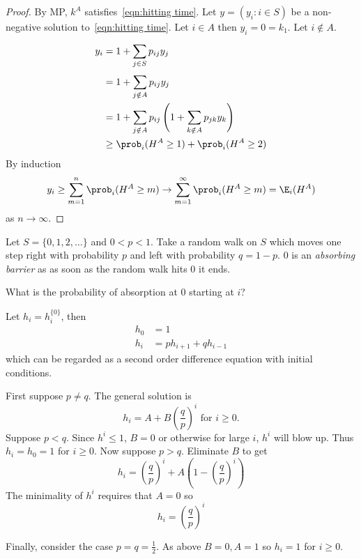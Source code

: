 \documentclass[a4paper]{article}
\begin{document}
\begin{proof}
  By MP, \(k^A\) satisfies~\eqref{eqn:hitting time}. Let \(y = (y_i: i \in S)\) be a non-negative solution to~\eqref{eqn:hitting time}. Let \(i \in A\) then \(y_i = 0 = k_1\). Let \(i \notin A\).
  \begin{align*}
    y_i &= 1 + \sum_{j \in S}^{ } p_{ij}y_j \\
        &= 1 + \sum_{j \notin A}^{ } p_{ij}y_j \\
        &= 1 + \sum_{j \notin A}^{ } p_{ij} \left( 1+ \sum_{k \notin A}^{ } p_{jk}y_k \right) \\
        &\geq \prob_i(H^A \geq 1) + \prob_i(H^A \geq 2)
  \end{align*}
  By induction
  \[
    y_i \geq \sum_{m = 1}^{n} \prob_i(H^A \geq m) \to \sum_{m = 1}^{\infty} \prob_i(H^A \geq m) = \E_i(H^A)
  \]
  as \(n \to \infty\).
\end{proof}

\begin{eg}
  Let \(S = \{0, 1, 2, \dots \}\) and \(0 < p < 1\). Take a random walk on \(S\) which moves one step right with probability \(p\) and left with probability \(q = 1 - p\). \(0\) is an \emph{absorbing barrier} as as soon as the random walk hits \(0\) it ends.

  \begin{question}
    What is the probability of absorption at \(0\) starting at \(i\)?
  \end{question}

  \begin{answer}
    Let \(h_i = h_i^{\{0\}}\), then
    \begin{align*}
      h_0 &= 1 \\
      h_i &= p h_{i+1} + q h_{i-1}
    \end{align*}
    which can be regarded as a second order difference equation with initial conditions.

    First suppose \(p \neq q\). The general solution is
    \[
      h_i = A + B \left( \frac{q}{p} \right)^i \text{ for } i \geq 0.
    \]
    Suppose \(p < q\). Since \(h^i \leq 1\), \(B = 0\) or otherwise for large \(i\), \(h^i\) will blow up. Thus \(h_i = h_0 = 1\) for \(i \geq 0\). Now suppose \(p > q\). Eliminate \(B\) to get
    \[
      h_i = \left( \frac{q}{p} \right)^i + A \left( 1 - \left( \frac{q}{p} \right)^i \right)
    \]
    The minimality of \(h^i\) requires that \(A = 0\) so
    \[
      h_i = \left( \frac{q}{p} \right)^i
    \]

    Finally, consider the case \(p = q = \frac{1}{2}\). As above \(B = 0, A = 1\) so \(h_i = 1\) for \(i \geq 0\).
  \end{answer}
\end{eg}
\end{document}
